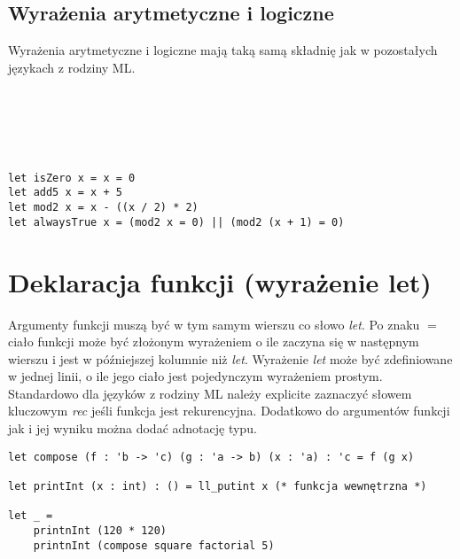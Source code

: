 \documentclass[declaration,shortabstract]{iithesis}
\begin{document}
\subsection{Wyrażenia arytmetyczne i logiczne}
Wyrażenia arytmetyczne i logiczne mają taką samą składnię jak w pozostałych
językach z rodziny ML.
\begin{bnf*}
    {    
    }\\
    {    
    }\\
    { \bnfts{+} \bnfor \bnfts{-} \bnfor \bnfts{*}
      \bnfor \bnfts{/} 
    }\\
    { \bnfts{\&\&} \bnfor \bnfts{$\|$} 
    }\\
\end{bnf*}


\begin{lstlisting}[frame=single, caption=Przykłady wyrażeń arytmetycznych i 
logicznych.]
let isZero x = x = 0 
let add5 x = x + 5
let mod2 x = x - ((x / 2) * 2)
let alwaysTrue x = (mod2 x = 0) || (mod2 (x + 1) = 0)
\end{lstlisting}

\section{Deklaracja funkcji (wyrażenie let)}

Argumenty funkcji muszą być w tym samym wierszu co słowo \textit{let}. Po znaku 
$=$ ciało funkcji może być złożonym wyrażeniem o ile zaczyna się w następnym wierszu i 
jest w późniejszej kolumnie niż \textit{let}. Wyrażenie \textit{let} może być 
zdefiniowane w jednej linii, o ile jego ciało jest pojedynczym wyrażeniem prostym.
Standardowo dla języków z rodziny ML należy explicite zaznaczyć słowem 
kluczowym \textit{rec} jeśli funkcja jest rekurencyjna. Dodatkowo do argumentów
funkcji jak i jej wyniku można dodać adnotację typu.

\begin{lstlisting}[frame=single, caption=Deklaracja funkcji z anotacjami.]
let compose (f : 'b -> 'c) (g : 'a -> b) (x : 'a) : 'c = f (g x)

let printInt (x : int) : () = ll_putint x (* funkcja wewnętrzna *)

let _ = 
    printnInt (120 * 120)
    printnInt (compose square factorial 5)
\end{lstlisting}
\end{document}
